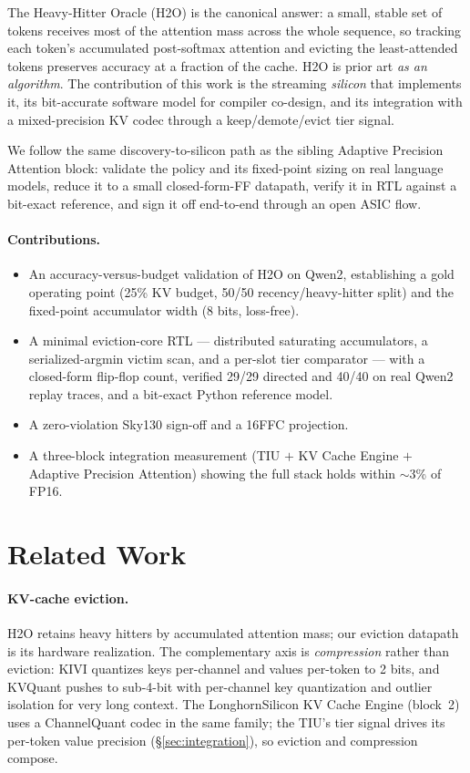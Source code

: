 \documentclass[10pt,twocolumn]{article}
\begin{document}
The Heavy-Hitter Oracle (H2O) \citep{zhang2023h2o} is the canonical answer: a
small, stable set of tokens receives most of the attention mass across the whole
sequence, so tracking each token's accumulated post-softmax attention and evicting
the least-attended tokens preserves accuracy at a fraction of the cache. H2O is
prior art \emph{as an algorithm}. The contribution of this work is the streaming
\emph{silicon} that implements it, its bit-accurate software model for compiler
co-design, and its integration with a mixed-precision KV codec through a
keep/demote/evict tier signal.

We follow the same discovery-to-silicon path as the sibling Adaptive Precision
Attention block: validate the policy and its fixed-point sizing on real language
models, reduce it to a small closed-form-FF datapath, verify it in RTL against a
bit-exact reference, and sign it off end-to-end through an open ASIC flow.

\paragraph{Contributions.}
\begin{itemize}
  \item An accuracy-versus-budget validation of H2O on Qwen2, establishing a gold
    operating point (25\% KV budget, 50/50 recency/heavy-hitter split) and the
    fixed-point accumulator width (8 bits, loss-free).
  \item A minimal eviction-core RTL --- distributed saturating accumulators, a
    serialized-argmin victim scan, and a per-slot tier comparator --- with a
    closed-form flip-flop count, verified 29/29 directed and 40/40 on real Qwen2
    replay traces, and a bit-exact Python reference model.
  \item A zero-violation Sky130 sign-off and a 16FFC projection.
  \item A three-block integration measurement (TIU $+$ KV Cache Engine $+$
    Adaptive Precision Attention) showing the full stack holds within $\sim$3\% of
    FP16.
\end{itemize}

\section{Related Work}

\paragraph{KV-cache eviction.}
H2O \citep{zhang2023h2o} retains heavy hitters by accumulated attention mass; our
eviction datapath is its hardware realization. The complementary axis is
\emph{compression} rather than eviction: KIVI \citep{liu2024kivi} quantizes keys
per-channel and values per-token to 2 bits, and KVQuant \citep{hooper2024kvquant}
pushes to sub-4-bit with per-channel key quantization and outlier isolation for
very long context. The LonghornSilicon KV Cache Engine (block~2) uses a
ChannelQuant codec in the same family; the TIU's tier signal drives its per-token
value precision (\S\ref{sec:integration}), so eviction and compression compose.
\end{document}
